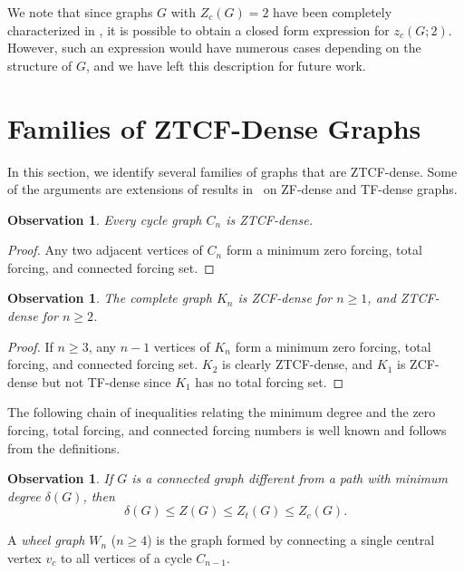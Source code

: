 \documentclass[11pt]{article}
\newtheorem{ob}[thm]{Observation}
\theoremstyle{definition}
\newcommand{\1}{\vspace{0.1cm}}
\newcommand{\2}{\vspace{0.2cm}}
\newcommand{\3}{\vspace{0.3cm}}
\begin{document}
We note that since graphs $G$ with $Z_c(G)=2$ have been completely characterized in \cite{extremalcf}, it is possible to obtain a closed form expression for $z_c(G;2)$. However, such an expression would have numerous cases  depending on the structure of $G$, and we have left this description for future work. 







\section{Families of ZTCF-Dense Graphs}\label{sec:basics}

In this section, we identify several families of graphs that are ZTCF-dense. Some of the arguments are extensions of results in~\cite{DaHePe2023a} on ZF-dense and TF-dense graphs. 




\begin{ob}
Every cycle graph $C_n$ is ZTCF-dense.
\end{ob}
\begin{proof}
Any two adjacent vertices of $C_n$ form a minimum zero forcing, total forcing, and connected forcing set.
\end{proof}

\begin{ob}\label{ob:kn}
The complete graph $K_n$ is ZCF-dense for $n \geq 1$, and ZTCF-dense for $n\geq 2$.
\end{ob}
\begin{proof}
If $n\geq 3$, any $n-1$ vertices of $K_n$ form a minimum zero forcing, total forcing, and connected forcing set. $K_2$ is clearly ZTCF-dense, and $K_1$ is ZCF-dense but not TF-dense since $K_1$ has no total forcing set.
\end{proof}


The following chain of inequalities relating the minimum degree and the zero forcing, total forcing, and connected forcing numbers is well known and follows from the definitions.

\begin{ob}\label{ob:min_degree}
If $G$ is a connected graph different from a path with minimum degree $\delta(G)$, then
\[\delta(G)\leq Z(G) \leq Z_t(G) \leq Z_c(G).\]
\end{ob}

A \emph{wheel graph} $W_n$ ($n\geq 4$) is the graph formed by connecting a single central vertex $v_c$ to all vertices of a cycle $C_{n-1}$. 
\end{document}
